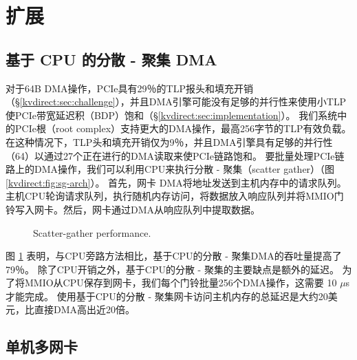 \section{扩展}
\label{kvdirect:sec:extensions}

\subsection{基于 CPU 的分散 - 聚集 DMA}


对于64B DMA操作，PCIe具有29％的TLP报头和填充开销（\S \ref {kvdirect:sec:challenge}），并且DMA引擎可能没有足够的并行性来使用小TLP使PCIe带宽延迟积（BDP）饱和（\S\ref{kvdirect:sec:implementation}）。
我们系统中的PCIe根（root complex）支持更大的DMA操作，最高256字节的TLP有效负载。 在这种情况下，TLP头和填充开销仅为9％，并且DMA引擎具有足够的并行性（64）以通过27个正在进行的DMA读取来使PCIe链路饱和。
要批量处理PCIe链路上的DMA操作，我们可以利用CPU来执行分散 - 聚集（scatter gather）（图 \ref {kvdirect:fig:sg-arch}）。
首先，网卡 DMA将地址发送到主机内存中的请求队列。主机CPU轮询请求队列，执行随机内存访问，将数据放入响应队列并将MMIO门铃写入网卡。然后，网卡通过DMA从响应队列中提取数据。

\begin{figure}[t]
\centering
{}
\caption{Scatter-gather performance.}
\label{kvdirect:fig:scatter-gather}

\end{figure}

图 \ref {kvdirect:fig:scatter-gather} 表明，与CPU旁路方法相比，基于CPU的分散 - 聚集DMA的吞吐量提高了79％。
除了CPU开销之外，基于CPU的分散 - 聚集的主要缺点是额外的延迟。
为了将MMIO从CPU保存到网卡，我们每个门铃批量256个DMA操作，这需要 10 $\mu$s 才能完成。
使用基于CPU的分散 - 聚集网卡访问主机内存的总延迟是大约20美元，比直接DMA高出近20倍。

\subsection{单机多网卡}
\label{kvdirect:sec:multi-nic}

